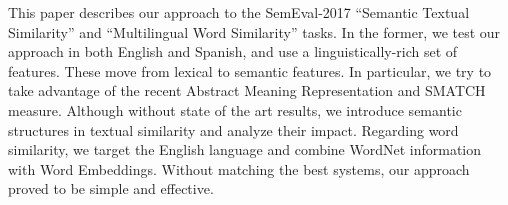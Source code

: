 This paper describes our approach to the SemEval-2017 ``Semantic Textual Similarity'' and ``Multilingual Word Similarity'' tasks. In the former, we test our approach in both English and Spanish, and use a linguistically-rich set of features. These move from lexical to semantic features. In particular, we try to take advantage of the recent Abstract Meaning Representation and SMATCH measure. Although without state of the art results, we introduce semantic structures in textual similarity and analyze their impact. Regarding word similarity, we target the English language and combine WordNet information with Word Embeddings. Without matching the best systems, our approach proved to be simple and effective.
